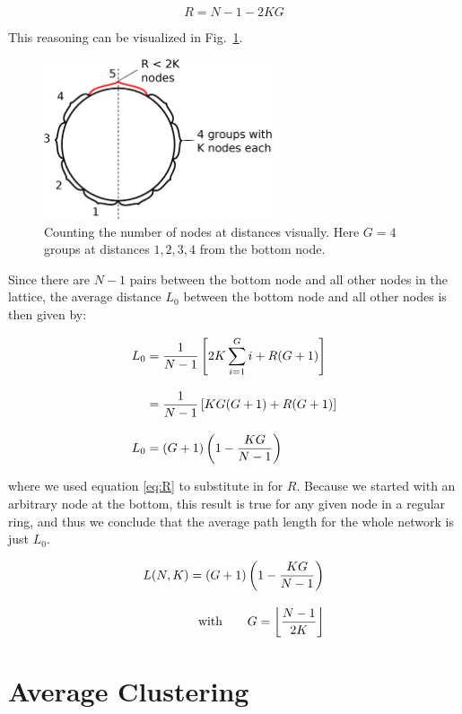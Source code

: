 \begin{apendicesenv}
\begin{equation}
    R = N - 1 - 2KG
    \label{eq:R}
\end{equation}

\noindent This reasoning can be visualized in Fig.~\ref{fig:Lgroups}.

\begin{figure}
\centering
\includegraphics[width=0.6\textwidth]{fig/path_length_groups.eps}
\caption{Counting the number of nodes at distances visually. Here $G=4$ groups at distances $1,2,3,4$ from the bottom node.}
\label{fig:Lgroups}
\end{figure}

Since there are $N-1$ pairs between the bottom node and all other nodes in the lattice, the average distance $L_0$ between the bottom
node and all other nodes is then given by:

\begin{align}
    L_0 &= \frac{1}{N-1} \left[ 2K \sum_{i=1}^Gi + R(G+1) \right] \notag \\[9pt]
        &= \frac{1}{N-1} \left[ KG(G+1) + R(G+1) \right] \notag \\[9pt]
    L_0 &= \left(G + 1\right) \left( 1 - \frac{KG}{N-1} \right)
\end{align}

\noindent where we used equation \ref{eq:R} to substitute in for $R$.  Because we started with an arbitrary node at the bottom, this
result is true for any given node in a regular ring, and thus we conclude that the average path length for the whole network is just
$L_0$.

\begin{align}
    L(N,K) = \left(G + 1\right) \left( 1 - \frac{KG}{N-1} \right) \notag \\[9pt]
    \text{with} \qquad G=\floor*{\frac{N-1}{2K}}
\end{align}

\section{Average Clustering}


\end{apendicesenv}
